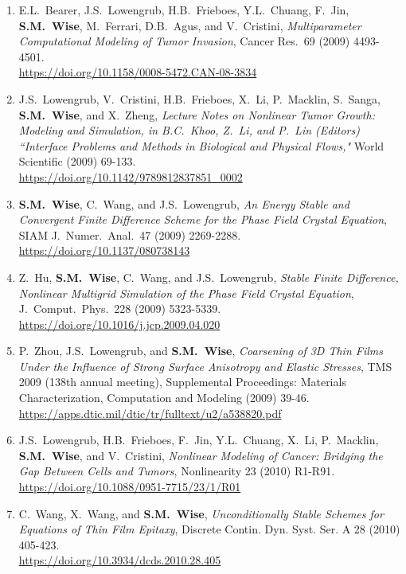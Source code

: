 \documentclass[11pt]{letter}
\begin{document}
\begin{enumerate}
	\item
E.L.~Bearer, J.S.~Lowengrub, H.B.~Frieboes, Y.L.~Chuang, F.~Jin, \textbf{S.M.~Wise}, M.~Ferrari, D.B.~Agus, and V.~Cristini, {\sl Multiparameter Computational Modeling of Tumor Invasion}, Cancer Res.~69 (2009) 4493-4501.
	\\
\url{https://doi.org/10.1158/0008-5472.CAN-08-3834}

	\item
J.S.~Lowengrub, V.~Cristini, H.B.~Frieboes, X.~Li, P.~Macklin, S.~Sanga, \textbf{S.M.~Wise}, and X.~Zheng, {\sl Lecture Notes on Nonlinear Tumor Growth: Modeling and Simulation, in  B.C.~Khoo, Z.~Li, and P.~Lin (Editors) ``Interface Problems and Methods in Biological and Physical Flows,"} World Scientific (2009) 69-133.
	\\
\url{https://doi.org/10.1142/9789812837851_0002}

	\item
\textbf{S.M.~Wise}, C.~Wang, and J.S.~Lowengrub, {\sl An Energy Stable and Convergent Finite Difference Scheme for the Phase Field Crystal Equation}, SIAM J.~Numer.~Anal.~47 (2009) 2269-2288.
	\\
\url{https://doi.org/10.1137/080738143}

	\item
Z.~Hu, \textbf{S.M.~Wise}, C.~Wang, and J.S.~Lowengrub, {\sl Stable Finite Difference, Nonlinear Multigrid Simulation of the Phase Field Crystal Equation}, J.~Comput.~Phys.~228 (2009) 5323-5339.
	\\
\url{https://doi.org/10.1016/j.jcp.2009.04.020}

	\item
P.~Zhou, J.S.~Lowengrub, and \textbf{S.M.~Wise}, {\sl Coarsening of 3D Thin Films Under the Influence of Strong Surface Anisotropy and Elastic Stresses}, TMS 2009 (138th annual meeting), Supplemental Proceedings: Materials Characterization, Computation and Modeling (2009) 39-46.
	\\
\url{https://apps.dtic.mil/dtic/tr/fulltext/u2/a538820.pdf}

	\item
J.S.~Lowengrub, H.B.~Frieboes, F.~Jin, Y.L.~Chuang, X.~Li, P.~Macklin, \textbf{S.M.~Wise}, and V.~Cristini, {\sl Nonlinear Modeling of Cancer: Bridging the Gap Between Cells and Tumors}, Nonlinearity 23 (2010) R1-R91.
	\\
\url{https://doi.org/10.1088/0951-7715/23/1/R01}

	\item
C.~Wang, X.~Wang, and \textbf{S.M.~Wise}, {\sl Unconditionally Stable Schemes for Equations of Thin Film Epitaxy}, Discrete Contin. Dyn. Syst. Ser. A 28 (2010) 405-423.
	\\
\url{https://doi.org/10.3934/dcds.2010.28.405}


\end{enumerate}
\end{document}
